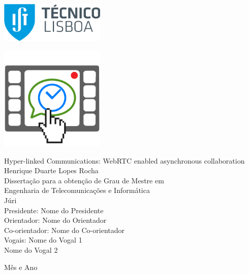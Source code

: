 \thispagestyle {empty}

\includegraphics[width=5.0cm]{Logo.png}

\begin{center}
%
\vspace{0.3cm}
\hspace{-0.5cm}\includegraphics[height=50mm]{Figures/logo.png}

\vspace{0.8cm}
{\FontLb Hyper-linked Communications: WebRTC enabled asynchronous collaboration} \\
\vspace{2.6cm}
{\FontMb Henrique Duarte Lopes Rocha} \\
\vspace{1.9cm}
{\FontLn Disserta\c{c}\~{a}o para a obten\c{c}\~{a}o de Grau de Mestre em} \\
\vspace{0.3cm}
{\FontLb Engenharia de Telecomunicações e Informática} \\
\vspace{1.9cm}
{\FontMb J\'{u}ri} \\
\vspace{0.3cm}
{\FontSn %
Presidente:        Nome do Presidente \\
Orientador:        Nome do Orientador \\
Co-orientador:     Nome do Co-orientador \\
Vogais:            Nome do Vogal 1 \\
                   Nome do Vogal 2 \\
}
\vspace{1.5cm}

{\FontMb M\^{e}s e Ano} \\
%
\end{center}

\cleardoublepage

\restoregeometry
